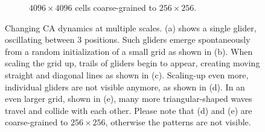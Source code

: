 \begin{figure}[htbp]
\begin{subfigure}{.48\linewidth}
    \caption{\label{subfig:waves_c} $4096 \times 4096$ cells coarse-grained to $256 \times 256$.}
  \end{subfigure}
  \caption{\label{fig:dynamics_levels} Changing CA dynamics at multiple scales.
    (a) shows a single glider, oscillating between 3 positions. Such gliders
    emerge spontaneously from a random initialization of a small grid as shown
    in (b). When scaling the grid up, trails of gliders begin to appear,
    creating moving straight and diagonal lines as shown in (c). Scaling-up even
    more, individual gliders are not visible anymore, as shown in (d). In an
    even larger grid, shown in (e), many more triangular-shaped waves travel and
    collide with each other. Please note that (d) and (e) are coarse-grained to
    $256 \times 256$, otherwise the patterns are not visible.}
\end{figure}


